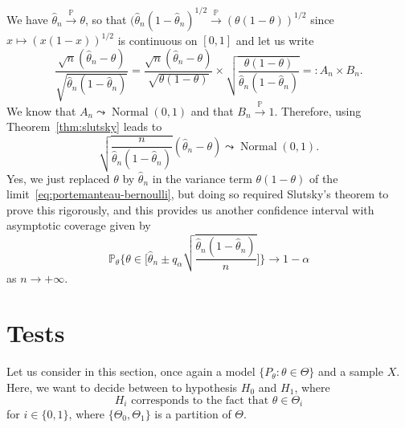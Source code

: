 \documentclass[
	fontsize=11pt, %
	twoside=false, %
	numbers=noenddot, %
]{kaobook}
\DeclareMathOperator{\nor}{Normal}
\renewcommand{\P}{\mathbb P}
\newcommand{\wh}{\widehat}
\newcommand{\goes}{\rightarrow}
\newcommand{\gopro}{\overset{\P}{\rightarrow}}
\newcommand{\gosto}{\leadsto}
\begin{document}
We have $\wh \theta_n \gopro \theta$, so that $(\wh \theta_n (1 - \wh \theta_n)^{1/2} \gopro (\theta (1 -  \theta))^{1/2}$ since $x \mapsto (x(1-x))^{1/2}$ is continuous on $[0, 1]$ and let us write
\begin{equation*}
	\frac{\sqrt n (\wh \theta_n - \theta)}{\sqrt{\wh \theta_n (1 - \wh \theta_n)}} 
	= \frac{\sqrt n (\wh \theta_n - \theta)}{\sqrt{ \theta (1 -  \theta)}} \times 
	\sqrt{\frac{ \theta (1 -  \theta)}{\wh \theta_n (1 - \wh \theta_n)}} =: A_n \times B_n.
\end{equation*}
We know that $A_n \gosto \nor(0, 1)$ and that $B_n \gopro 1$.
Therefore, using Theorem~\ref{thm:slutsky} leads%
%
to
\begin{equation*}
	\sqrt{\frac{n}{\wh \theta_n (1 - \wh \theta_n)}} (\wh \theta_n - \theta) \gosto \nor(0, 1).
\end{equation*}
Yes, we just replaced $\theta$ by $\wh \theta_n$ in the variance term $\theta(1 - \theta)$ of the limit~\eqref{eq:portemanteau-bernoulli}, but doing so required Slutsky's theorem to prove this rigorously, and this provides us another confidence interval with asymptotic coverage given by
\begin{equation*}
	\P_\theta \bigg\{ \theta \in \Big[ \wh \theta_n \pm q_\alpha \sqrt{\frac{\wh \theta_n (1 - \wh \theta_n)}{n}} \Big] \bigg\} \goes 1 - \alpha
\end{equation*}
as $n \goes +\infty$.%
%


\section{Tests} %
\label{sec:tests}

Let us consider in this section, once again a model $\{ P_\theta : \theta \in \Theta \}$ and a sample $X$.
Here, we want to decide between to hypothesis $H_0$ and $H_1$, where
\begin{equation*}
	H_i \text{ corresponds to the fact that } \theta \in \Theta_i
\end{equation*}
for $i \in \{ 0, 1 \}$, where $\{ \Theta_0, \Theta_1 \}$ is a partition of $\Theta$.
\end{document}
